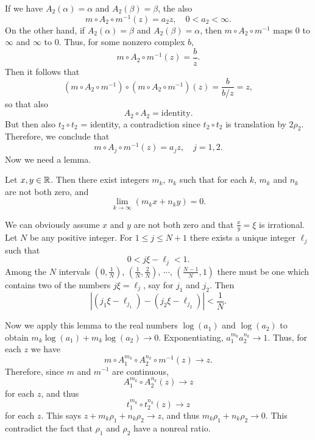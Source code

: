 \documentclass[a4paper,11pt]{article}
\begin{document}
If we have $A_2(\alpha) = \alpha$ and $A_2(\beta) = \beta$, the also
$$
m \circ A_2 \circ m^{-1}(z) = a_2 z, \quad 0 < a_2 < \infty.
$$
On the other hand, if $A_2(\alpha) = \beta$ and $A_2(\beta) = \alpha$,
then $m \circ A_2 \circ m^{-1}$ maps 0 to $\infty$ and $\infty$ to 0.
Thus, for some nonzero complex $b$,
$$
m \circ A_2 \circ m^{-1}(z) = \frac{b}{z}.
$$
Then it follows that
$$
(m \circ A_2 \circ m^{-1}) \circ (m \circ A_2 \circ m^{-1})(z)
= \frac{b}{b/z} = z,
$$
so that also
$$
A_2 \circ A_2 = \text{identity}.
$$
But then also $t_2 \circ t_2$ = identity, a contradiction since $t_2
\circ t_2$ is translation by $2\rho_2$.  Therefore, we conclude that
$$
m \circ A_j \circ m^{-1}(z) = a_j z, \quad j = 1,2.
$$
Now we need a lemma.

\begin{lem}
  \label{lem:3}
  Let $x,y \in {\mathbb R}$.  Then there exist integers $m_k$, $n_k$ such that
  for each $k$, $m_k$ and $n_k$ are not both zero, and
  $$
  \lim_{k\to \infty} (m_k x + n_k y) = 0.
  $$
\end{lem}

\begin{myproof}
  We can obviously assume $x$ and $y$ are not both zero and that
  $\frac{x}{y} = \xi$ is irrational.  Let $N$ be any positive
  integer.  For $1 \le j \le N+1$ there exists a unique integer
  $\ell_j$ such that
  $$
  0 < j\xi - \ell_j < 1.
  $$
  Among the $N$ intervals $(0, \frac{1}{N})$, $(\frac{1}{N},
  \frac{2}{N})$, $\cdots$, $(\frac{N-1}{N}, 1)$ there must be one
  which contains two of the numbers $j \xi = \ell_j$, say for $j_1$
  and $j_2$.  Then
  $$
  |(j_1 \xi - \ell_{j_1}) - (j_2 \xi - \ell_{j_2})| < \frac{1}{N}.
  $$
\end{myproof}

Now we apply this lemma to the real numbers $\log(a_1)$ and
$\log(a_2)$ to obtain $m_k \log(a_1) + m_k\log(a_2) \to 0$.
Exponentiating, $a_1^{m_k} a_2^{n_k} \to 1$.  Thus, for each $z$ we
have
$$
m \circ A_1^{m_k} \circ A_2^{n_k} \circ m^{-1} (z) \to z.
$$
Therefore, since $m$ and $m^{-1}$ are continuous,
$$
A_1^{m_k} \circ A_2^{n_k}(z) \to z
$$
for each $z$, and thus
$$
t_1^{m_k} \circ t_2^{n_k}(z) \to z
$$
for each $z$.  This says $z + m_k\rho_1 + n_k \rho_2 \to z$, and thus
$m_k \rho_1 + n_k \rho_2 \to 0$.  This contradict the fact that
$\rho_1$ and $\rho_2$ have a nonreal ratio.
\end{document}
